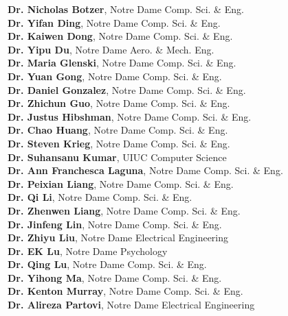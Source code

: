 \documentclass[10pt]{article}
\newenvironment{myindentpar}[1]%
{\begin{list}{}%
         {\setlength{\leftmargin}{#1}}%
         \item[]%
}
{\end{list}}
\newcounter{list}
\begin{document}
\begin{myindentpar}{0.75cm}
{\textcolor{white}{.}{\bf Dr. Nicholas Botzer}, Notre Dame Comp. Sci. \& Eng. \\
\textcolor{white}{.}{\bf Dr. Yifan Ding}, Notre Dame Comp. Sci. \& Eng. \\
\textcolor{white}{.}{\bf Dr. Kaiwen Dong}, Notre Dame Comp. Sci. \& Eng. \\
\textcolor{white}{.}{\bf Dr. Yipu Du}, Notre Dame Aero. \& Mech. Eng. \\
\textcolor{white}{.}{\bf Dr. Maria Glenski}, Notre Dame Comp. Sci. \& Eng. \\
\textcolor{white}{.}{\bf Dr. Yuan Gong}, Notre Dame Comp. Sci. \& Eng. \\
\textcolor{white}{.}{\bf Dr. Daniel Gonzalez}, Notre Dame Comp. Sci. \& Eng. \\
\textcolor{white}{.}{\bf Dr. Zhichun Guo}, Notre Dame Comp. Sci. \& Eng. \\
\textcolor{white}{.}{\bf Dr. Justus Hibshman}, Notre Dame Comp. Sci. \& Eng. \\
\textcolor{white}{.}{\bf Dr. Chao Huang}, Notre Dame Comp. Sci. \& Eng. \\
\textcolor{white}{.}{\bf Dr. Steven Krieg}, Notre Dame Comp. Sci. \& Eng. \\
\textcolor{white}{.}{\bf Dr. Suhansanu Kumar}, UIUC Computer Science \\
\textcolor{white}{.}{\bf Dr. Ann Franchesca Laguna}, Notre Dame Comp. Sci. \& Eng. \\
\textcolor{white}{.}{\bf Dr. Peixian Liang}, Notre Dame Comp. Sci. \& Eng. \\
\textcolor{white}{.}{\bf Dr. Qi Li}, Notre Dame Comp. Sci. \& Eng. \\
\textcolor{white}{.}{\bf Dr. Zhenwen Liang}, Notre Dame Comp. Sci. \& Eng. \\
\textcolor{white}{.}{\bf Dr. Jinfeng Lin}, Notre Dame Comp. Sci. \& Eng. \\
\textcolor{white}{.}{\bf Dr. Zhiyu Liu}, Notre Dame Electrical Engineering \\
\textcolor{white}{.}{\bf Dr. EK Lu}, Notre Dame Psychology \\
\textcolor{white}{.}{\bf Dr. Qing Lu}, Notre Dame Comp. Sci. \& Eng. \\
\textcolor{white}{.}{\bf Dr. Yihong Ma}, Notre Dame Comp. Sci. \& Eng. \\
\textcolor{white}{.}{\bf Dr. Kenton Murray}, Notre Dame Comp. Sci. \& Eng. \\
\textcolor{white}{.}{\bf Dr. Alireza Partovi}, Notre Dame Electrical Engineering \\
}
\end{myindentpar}
\end{document}
